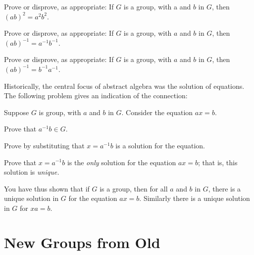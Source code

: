 \begin{problem}
Prove or disprove, as appropriate: If \(G\) is a group, with a and \(b\) in \(G\), then \((ab)^2 = a^2b^2\).
\end{problem}

\begin{problem}
Prove or disprove, as appropriate: If \(G\) is a group, with \(a\) and \(b\) in \(G\), then \((ab)^{-1} = a^{-1}b^{-1}\).
\end{problem}

\begin{problem}
Prove or disprove, as appropriate: If \(G\) is a group, with \(a\) and \(b\) in \(G\), then \((ab)^{-1} = b^{-1}a^{-1}\).
\begin{annotation}
\end{annotation}
\end{problem}

Historically, the central focus of abstract algebra was the solution of equations. The following problem gives an indication of the connection:

\begin{problem}\label{prob:existuniquesol}
Suppose \(G\) is group, with \(a\) and \(b\) in \(G\). Consider the equation \(ax = b\).
\begin{problemparts}
  \item Prove that \(a^{-1}b \in G\).
  \item Prove by substituting that \(x = a^{-1}b\) is a solution for the equation.
  \item Prove that \(x = a^{-1}b\) is the \emph{only} solution for the equation \(ax = b\); that is, this solution is \emph{unique.}
\begin{annotation}
\end{annotation}
\end{problemparts}
\end{problem}

You have thus shown that if \(G\) is a group, then for all \(a\) and \(b\) in \(G\), there is a unique solution in \(G\) for the equation \(ax = b\). Similarly there is a unique solution in \(G\) for \(xa = b\).

\chapter{New Groups from Old}

